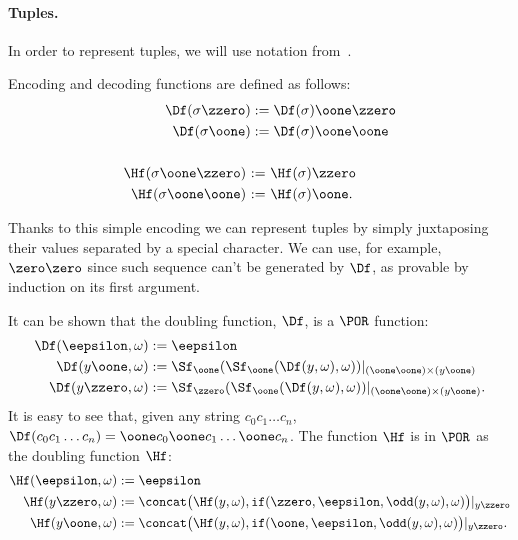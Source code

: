 \paragraph{Tuples.}
In order to represent tuples,
we will use notation from~\cite[p. 183]{Odifreddi}.

\begin{defn}
Encoding and decoding functions
are defined as follows:
\begin{align*}
\Df(\sigma\zzero) &:= \Df(\sigma)\oone\zzero \\
%
\Df(\sigma\oone) &:= \Df(\sigma)\oone\oone \\
\\
%
\Hf(\sigma\oone\zzero) \ &{:=} \
\Hf(\sigma)\zzero \\
%
\Hf(\sigma\oone\oone) \ &{:=} \ \Hf(\sigma)\oone.
\end{align*}
\end{defn}
%
%
\noindent
Thanks to this simple encoding we can
represent tuples by simply
juxtaposing their values separated by a special
character.
We can use, for example,
$\zero\zero$ since such sequence
can't be generated by $\Df$,
as provable by induction on its first argument.

It can be shown that the
{doubling function,
$\Df$,} is a $\POR$ function:
\begin{align*}
\Df(\eepsilon,\omega) &:= \eepsilon \\
%
\Df(y\oone,\omega) &:=
{\Sf_\oone(\Sf_\oone(\Df(y,\omega),
\omega))}|_{(\oone\oone)\times (y\oone)} \\
%
\Df(y\zzero,\omega) &:=
{\Sf_\zzero(\Sf_\oone
(\Df(y,\omega),\omega))}|_{(\oone\oone)\times
(y\oone)}.
\end{align*}
It is easy to see that, given any string
$c_0c_1\dots c_n$,
$\Df(c_0c_1\dots c_n)={\oone c_0
\oone c_1\dots \oone c_n}$.
The function $\Hf$ is in $\POR$
as the doubling function $\Hf$:
\begin{align*}
\Hf(\eepsilon,\omega) &:= \eepsilon \\
\Hf(y\zzero, \omega) &:= \concat\big(\Hf(y,\omega),
{\mathtt{if}}(\zzero,\eepsilon,
\odd(y,\omega),\omega)\big){|_{y\zzero}} \\
%
\Hf(y\oone,\omega) &:=
\concat\big(\Hf(y,\omega), {\mathtt{if}}
(\oone,\eepsilon,\odd(y,\omega),\omega)\big)
{|_{y\zzero}}.
\end{align*}




